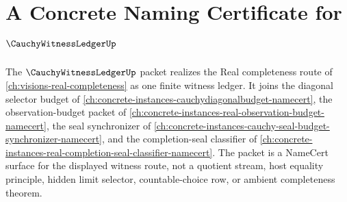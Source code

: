 \chapter{A Concrete Naming Certificate for $\CauchyWitnessLedgerUp$}
\label{ch:concrete-instances-cauchy-witness-ledger-namecert}

The $\CauchyWitnessLedgerUp$ packet realizes the Real completeness route of \autoref{ch:visions-real-completeness} as one finite witness ledger. It joins the diagonal selector budget of \autoref{ch:concrete-instances-cauchydiagonalbudget-namecert}, the observation-budget packet of \autoref{ch:concrete-instances-real-observation-budget-namecert}, the seal synchronizer of \autoref{ch:concrete-instances-cauchy-seal-budget-synchronizer-namecert}, and the completion-seal classifier of \autoref{ch:concrete-instances-real-completion-seal-classifier-namecert}. The packet is a NameCert surface for the displayed witness route, not a quotient stream, host equality principle, hidden limit selector, countable-choice row, or ambient completeness theorem.

